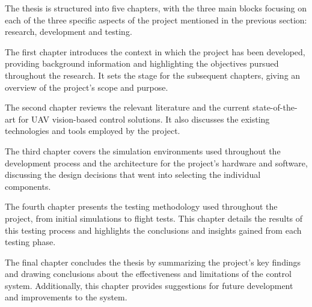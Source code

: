 
The thesis is structured into five chapters, with the three main blocks focusing on each of the three specific aspects of the project mentioned in the previous section: research, development and testing. 

The first chapter introduces the context in which the project has been developed, providing background information and highlighting the objectives pursued throughout the research. It sets the stage for the subsequent chapters, giving an overview of the project's scope and purpose.

The second chapter reviews the relevant literature and the current state-of-the-art for UAV vision-based control solutions. It also discusses the existing technologies and tools employed by the project.

The third chapter covers the simulation environments used throughout the development process and the architecture for the project's hardware and software, discussing the design decisions that went into selecting the individual components.

The fourth chapter presents the testing methodology used throughout the project, from initial simulations to flight tests. This chapter details the results of this testing process and highlights the conclusions and insights gained from each testing phase.

The final chapter concludes the thesis by summarizing the project's key findings and drawing conclusions about the effectiveness and limitations of the control system. Additionally, this chapter provides suggestions for future development and improvements to the system.
